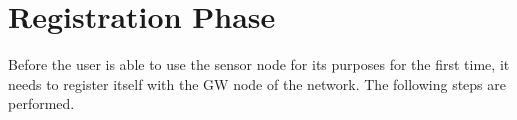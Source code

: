 \documentclass[a4paper,12pt]{report}
\begin{document}
\section{Registration Phase}
Before the user is able to use the sensor node for its purposes for
the first time, it needs to register itself with the GW node of the
network. The following steps are performed.


\begin{figure}[ht]
\end{figure}
\end{document}
